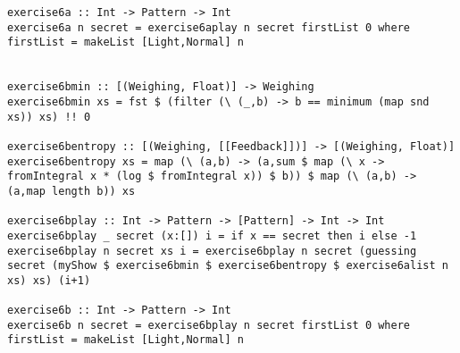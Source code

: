 \documentclass[a4paper,12pt]{amsart}
\begin{document}
\begin{verbatim}
exercise6a :: Int -> Pattern -> Int
exercise6a n secret = exercise6aplay n secret firstList 0 where firstList = makeList [Light,Normal] n


exercise6bmin :: [(Weighing, Float)] -> Weighing
exercise6bmin xs = fst $ (filter (\ (_,b) -> b == minimum (map snd xs)) xs) !! 0

exercise6bentropy :: [(Weighing, [[Feedback]])] -> [(Weighing, Float)]
exercise6bentropy xs = map (\ (a,b) -> (a,sum $ map (\ x -> fromIntegral x * (log $ fromIntegral x)) $ b)) $ map (\ (a,b) -> (a,map length b)) xs

exercise6bplay :: Int -> Pattern -> [Pattern] -> Int -> Int
exercise6bplay _ secret (x:[]) i = if x == secret then i else -1
exercise6bplay n secret xs i = exercise6bplay n secret (guessing secret (myShow $ exercise6bmin $ exercise6bentropy $ exercise6alist n xs) xs) (i+1)

exercise6b :: Int -> Pattern -> Int
exercise6b n secret = exercise6bplay n secret firstList 0 where firstList = makeList [Light,Normal] n
\end{verbatim}
\end{document}
